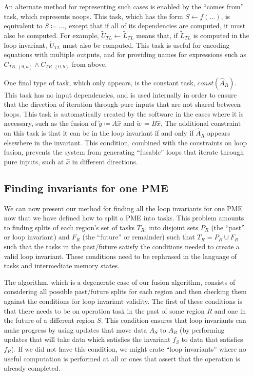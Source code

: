 \documentclass[12pt,letterpaper]{article}
\newcommand*{\opf}{f}
\begin{document}
An alternate method for representing such cases is enabled by the ``comes from'' task, which represents noops.
This task, which has the form $S \leftarrow f(\ldots)$, is equivalent to $S \coloneqq \ldots$, except that if all of its dependencies are computed, it must also be computed.
For example, $\widetilde{U}_{TL} \leftarrow \widetilde{L}_{TL}$ means that, if $\widetilde{L}_{TL}$ is computed in the loop invariant, $\widetilde{U}_{TL}$ must also be computed.
This task is useful for encoding equations with multiple outputs, and for providing names for expressions such as $C_{TR, (0, a)} \wedge C_{TR, (0, b)}$ from above.

One final type of task, which only appears, is the constant task, $const(\hat{A}_R)$.
This task has no input dependencies, and is used internally in order to ensure that the direction of iteration through pure inputs that are not shared between loops.
This task is automatically created by the software in the cases where it is necessary, such as the fusion of $\widetilde{y} \coloneqq A\hat{x}$ and $\widetilde{w} \coloneqq B\hat{x}$.
The additional constraint on this task is that it can be in the loop invariant if and only if $\hat{A}_R$ appears elsewhere in the invariant.
This condition, combined with the constraints on loop fusion, prevents the system from generating ``fusable'' loops that iterate through pure inputs, such at $\hat{x}$ in different directions.

\subsection{Finding invariants for one PME}
We can now present our method for finding all the loop invariants for one PME now that we have defined how to split a PME into tasks.
This problem amounts to finding splits of each region's set of tasks $T_R$, into disjoint sets $P_R$ (the ``past'' or loop invariant) and $F_R$ (the ``future'' or remainder) such that $T_R = P_R \cup F_R$ such that the tasks in the past/future satisfy the conditions needed to create a valid loop invariant.
These conditions need to be rephrased in the language of tasks and intermediate memory states.

The algorithm, which is a degenerate case of our fusion algorithm, consists of considering all possible past/future splits for each region and then checking them against the conditions for loop invariant validity.
The first of these conditions is that there needs to be on operation task in the past of some region $R$ and one in the future of a different region $S$.
This condition ensures that loop invariants can make progress by using updates that move data $A_S$ to $A_R$ (by performing updates that will take data which satisfies the invariant $\opf_S$ to data that satisfies $\opf_R$).
If we did not have this condition, we might crate ``loop invariants'' where no useful computation is performed at all or ones that assert that the operation is already completed.
\end{document}
